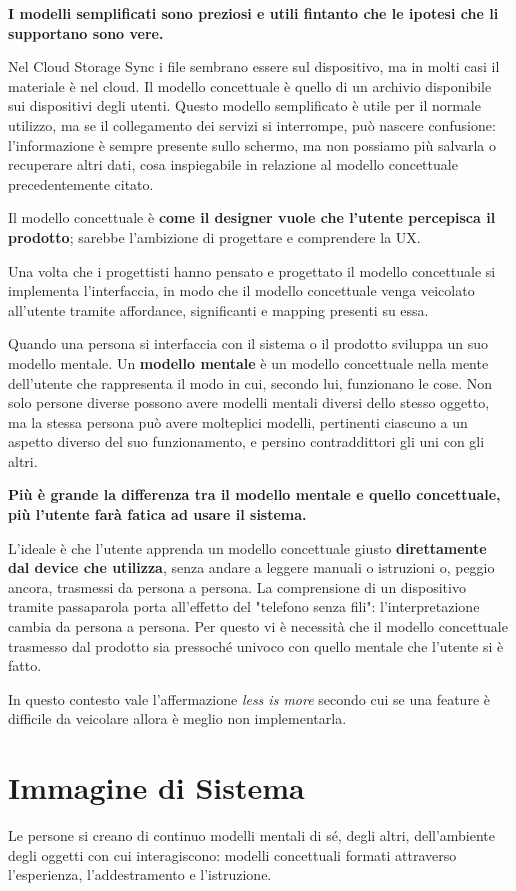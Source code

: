 \documentclass[a4paper,11pt,oneside]{book}
\begin{document}
\textbf{I modelli semplificati sono preziosi e utili fintanto che le ipotesi che li supportano sono vere.}

Nel Cloud Storage Sync i file sembrano essere sul dispositivo, ma in molti casi il materiale è nel cloud. Il modello concettuale è quello di un archivio disponibile sui dispositivi degli utenti. Questo modello semplificato è utile per il normale utilizzo, ma se il collegamento dei servizi si interrompe, può nascere confusione: l'informazione è sempre presente sullo schermo, ma non possiamo più salvarla o recuperare altri dati, cosa inspiegabile in relazione al modello concettuale precedentemente citato.

Il modello concettuale è \textbf{come il designer vuole che l'utente percepisca il prodotto}; sarebbe l'ambizione di progettare e comprendere la UX.

Una volta che i progettisti hanno pensato e progettato il modello concettuale si implementa l'interfaccia, in modo che il modello concettuale venga veicolato all'utente tramite affordance, significanti e mapping presenti su essa.

Quando una persona si interfaccia con il sistema o il prodotto sviluppa un suo modello mentale. Un \textbf{modello mentale} è un modello concettuale nella mente dell'utente che rappresenta il modo in cui, secondo lui, funzionano le cose. Non solo persone diverse possono avere modelli mentali diversi dello stesso oggetto, ma la stessa persona può avere molteplici modelli, pertinenti ciascuno a un aspetto diverso del suo funzionamento, e persino contraddittori gli uni con gli altri.

\textbf{Più è grande la differenza tra il modello mentale e quello concettuale, più l'utente farà fatica ad usare il sistema.}

L'ideale è che l'utente apprenda un modello concettuale giusto \textbf{direttamente dal device che utilizza}, senza andare a leggere manuali o istruzioni o, peggio ancora, trasmessi da persona a persona. La comprensione di un dispositivo tramite passaparola porta all'effetto del "telefono senza fili": l'interpretazione cambia da persona a persona. Per questo vi è necessità che il modello concettuale trasmesso dal prodotto sia pressoché univoco con quello mentale che l'utente si è fatto.

In questo contesto vale l'affermazione \textit{less is more} secondo cui se una feature è difficile da veicolare allora è meglio non implementarla.

\section{Immagine di Sistema}
Le persone si creano di continuo modelli mentali di sé, degli altri, dell'ambiente degli oggetti con cui interagiscono: modelli concettuali formati attraverso l'esperienza, l'addestramento e l'istruzione.
\end{document}
